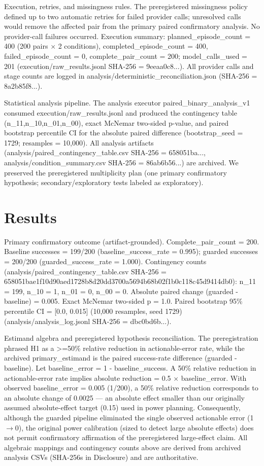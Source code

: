 \documentclass[conference]{IEEEtran}
\begin{document}
Execution, retries, and missingness rules. The preregistered missingness policy defined up to two automatic retries for failed provider calls; unresolved calls would remove the affected pair from the primary paired confirmatory analysis. No provider-call failures occurred. Execution summary: planned\_episode\_count = 400 (200 pairs \ensuremath{\times} 2 conditions), completed\_episode\_count = 400, failed\_episode\_count = 0, complete\_pair\_count = 200; model\_calls\_used = 201 (execution/raw\_results.jsonl SHA-256 = 9eeaa0c8...). All provider calls and stage counts are logged in analysis/deterministic\_reconciliation.json (SHA-256 = 8a2b85f8...).

Statistical analysis pipeline. The analysis executor paired\_binary\_analysis\_v1 consumed execution/raw\_results.jsonl and produced the contingency table (n\_11,n\_10,n\_01,n\_00), exact McNemar two-sided p-value, and paired bootstrap percentile CI for the absolute paired difference (bootstrap\_seed = 1729; resamples = 10,000). All analysis artifacts (analysis/paired\_contingency\_table.csv SHA-256 = 658051ba..., analysis/condition\_summary.csv SHA-256 = 86ab6b56...) are archived. We preserved the preregistered multiplicity plan (one primary confirmatory hypothesis; secondary/exploratory tests labeled as exploratory).

\section{Results}
Primary confirmatory outcome (artifact-grounded). Complete\_pair\_count = 200. Baseline successes = 199/200 (baseline\_success\_rate = 0.995); guarded successes = 200/200 (guarded\_success\_rate = 1.000). Contingency counts (analysis/paired\_contingency\_table.csv SHA-256 = 658051bae1f10d90aed1728b8d20dd3700a5694b68b02f1b0c118c45d9414db0): n\_11 = 199, n\_10 = 1, n\_01 = 0, n\_00 = 0. Absolute paired change (guarded - baseline) = 0.005. Exact McNemar two-sided p = 1.0. Paired bootstrap 95\% percentile CI = [0.0, 0.015] (10,000 resamples, seed 1729) (analysis/analysis\_log.jsonl SHA-256 = dbc0bd6b...).

Estimand algebra and preregistered hypothesis reconciliation. The preregistration phrased H1 as a >=50\% relative reduction in actionable-error rate, while the archived primary\_estimand is the paired success-rate difference (guarded - baseline). Let baseline\_error = 1 - baseline\_success. A 50\% relative reduction in actionable-error rate implies absolute reduction = 0.5 \ensuremath{\times} baseline\_error. With observed baseline\_error = 0.005 (1/200), a 50\% relative reduction corresponds to an absolute change of 0.0025 --- an absolute effect smaller than our originally assumed absolute-effect target (0.15) used in power planning. Consequently, although the guarded pipeline eliminated the single observed actionable error (1\ensuremath{\rightarrow}0), the original power calibration (sized to detect large absolute effects) does not permit confirmatory affirmation of the preregistered large-effect claim. All algebraic mappings and contingency counts above are derived from archived analysis CSVs (SHA-256s in Disclosure) and are authoritative.
\end{document}
